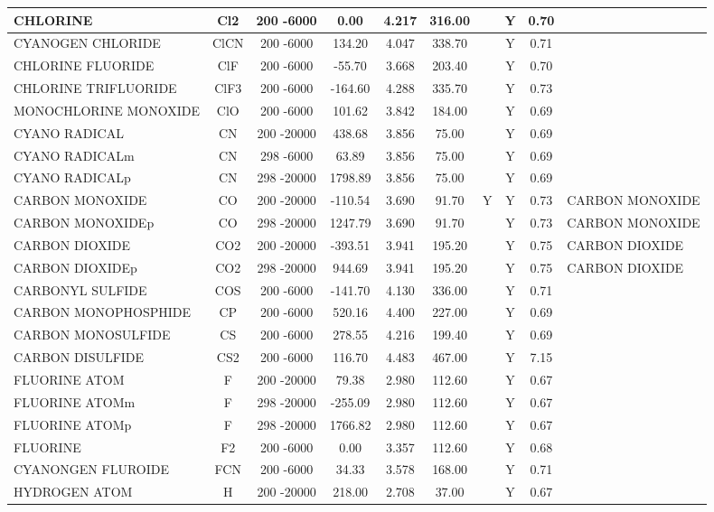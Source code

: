 \begin{longtable}{@{\extracolsep{\fill}}|l|c|c|c|c|c|c|c|c|l|}
CHLORINE&Cl2&200 -6000&    0.00& 4.217&   316.00& &Y& 0.70&\\ \hline
CYANOGEN CHLORIDE&ClCN&200 -6000&  134.20& 4.047&   338.70& &Y& 0.71&\\ \hline
CHLORINE FLUORIDE&ClF&200 -6000&  -55.70& 3.668&   203.40& &Y& 0.70&\\ \hline
CHLORINE TRIFLUORIDE&ClF3&200 -6000& -164.60& 4.288&   335.70& &Y& 0.73&\\ \hline
MONOCHLORINE MONOXIDE&ClO&200 -6000&  101.62& 3.842&   184.00& &Y& 0.69&\\ \hline
CYANO RADICAL&CN&200 -20000&  438.68& 3.856&    75.00& &Y& 0.69&\\ \hline
CYANO RADICALm&CN&298 -6000&   63.89& 3.856&    75.00& &Y& 0.69&\\ \hline
CYANO RADICALp&CN&298 -20000& 1798.89& 3.856&    75.00& &Y& 0.69&\\ \hline
CARBON MONOXIDE&CO&200 -20000& -110.54& 3.690&    91.70&Y&Y& 0.73&CARBON MONOXIDE\\ \hline
CARBON MONOXIDEp&CO&298 -20000& 1247.79& 3.690&    91.70& &Y& 0.73&CARBON MONOXIDE\\ \hline
CARBON DIOXIDE&CO2&200 -20000& -393.51& 3.941&   195.20& &Y& 0.75&CARBON DIOXIDE\\ \hline
CARBON DIOXIDEp&CO2&298 -20000&  944.69& 3.941&   195.20& &Y& 0.75&CARBON DIOXIDE\\ \hline
CARBONYL SULFIDE&COS&200 -6000& -141.70& 4.130&   336.00& &Y& 0.71&\\ \hline
CARBON MONOPHOSPHIDE&CP&200 -6000&  520.16& 4.400&   227.00& &Y& 0.69&\\ \hline
CARBON MONOSULFIDE&CS&200 -6000&  278.55& 4.216&   199.40& &Y& 0.69&\\ \hline
CARBON DISULFIDE&CS2&200 -6000&  116.70& 4.483&   467.00& &Y& 7.15&\\ \hline
FLUORINE ATOM&F&200 -20000&   79.38& 2.980&   112.60& &Y& 0.67&\\ \hline
FLUORINE ATOMm&F&298 -20000& -255.09& 2.980&   112.60& &Y& 0.67&\\ \hline
FLUORINE ATOMp&F&298 -20000& 1766.82& 2.980&   112.60& &Y& 0.67&\\ \hline
FLUORINE&F2&200 -6000&    0.00& 3.357&   112.60& &Y& 0.68&\\ \hline
CYANONGEN FLUROIDE&FCN&200 -6000&   34.33& 3.578&   168.00& &Y& 0.71&\\ \hline
HYDROGEN ATOM&H&200 -20000&  218.00& 2.708&    37.00& &Y& 0.67&\\ \hline

\end{longtable}
